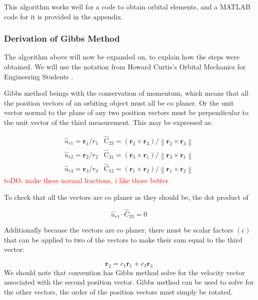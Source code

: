 \documentclass[12pt]{article}
\begin{document}
	This algorithm works well for a code to obtain orbital elements, and a MATLAB code for it is provided in the appendix.
		
	\subsubsection{Derivation of Gibbs Method}
	The algorithm above will now be expanded on, to explain how the steps were obtained. We will use the notation from Howard Curtis's Orbital Mechanics for Engineering Students \cite{curtis2013_gibbs}. 
	
	Gibbs method beings with the conservation of momentum, which means that all the position vectors of an orbiting object must all be co planer. Or the unit vector normal to the plane of any two position vectors must be perpendicular to the unit vector of the third measurement. This may be expressed as:
	
	\begin{eqnarray}
	\hat { { u } } _ { r 1 } = \mathbf { r } _ { 1 } / r _ { 1 }& \hat { \mathrm { C } } _ { 23 } = \left( \mathbf { r } _ { 2 } \times \mathbf { r } _ { 3 } \right) / \left\| \mathbf { r } _ { 2 } \times \mathbf { r } _ { 3 } \right\|\\
	\hat {{ u } } _ { r 2 } = \mathbf { r } _ { 2 } / r _ { 2 }&\hat { \mathrm { C } } _ { 31 } = \left( \mathbf { r } _ { 3 } \times \mathbf { r } _ { 1} \right) / \left\| \mathbf { r } _ { 3 } \times \mathbf { r } _ { 1 } \right\|\\
	\hat {{ u } } _ { r 3 } = \mathbf { r } _ { 3 } / r _ { 3} & \hat { \mathrm { C } } _ { 12 } = \left( \mathbf { r } _ { 1 } \times \mathbf { r } _ { 2 } \right) / \left\| \mathbf { r } _ { 1} \times \mathbf { r } _ { 2 } \right\|
	\end{eqnarray}
	\textcolor{red}{toDO, make these normal fractions, i like those better}
	
	To check that all the vectors are co planer as they should be, the dot product of 
	
	\begin{equation}
	\hat {  { u } } _ { r 1 } \cdot \hat {  { C } } _ { 23 } = 0
	\end{equation}
	
	Additionally because the vectors are co planer, there must be scalar factors $(c)$ that can be applied to two of the vectors to make their sum equal to the third vector:
	
	\begin{equation}
	\mathbf{r}_2 = c_1 \mathbf{ r }_1 + c_3 \mathbf{r}_3
	\label{eqn:cs}
	\end{equation}
	We should note that convention has Gibbs method solve for the velocity vector associated with the second position vector. Gibbs method can be used to solve for the other vectors, the order of the position vectors must simply be rotated.
	
\end{document}
